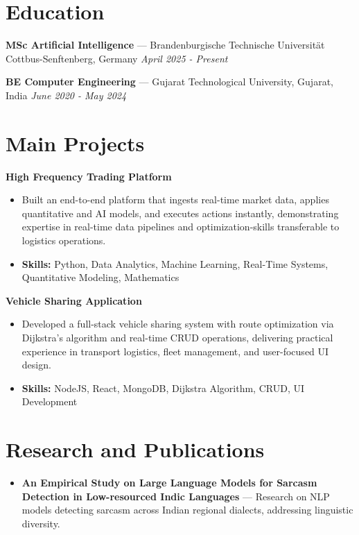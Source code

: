 \documentclass[a4paper,10pt]{article}
\begin{document}
\section*{Education}
\textbf{MSc Artificial Intelligence} — Brandenburgische Technische Universität Cottbus-Senftenberg, Germany \hfill \textit{April 2025 - Present}\par
\vspace{1.5pt}
\textbf{BE Computer Engineering} — Gujarat Technological University, Gujarat, India \hfill \textit{June 2020 - May 2024}\par

\section*{Main Projects}
\textbf{High Frequency Trading Platform}\par
\vspace{1pt}
\begin{itemize}
  \item Built an end-to-end platform that ingests real-time market data, applies quantitative and AI models, and executes actions instantly, demonstrating expertise in real-time data pipelines and optimization-skills transferable to logistics operations.
  \item \textbf{Skills:} Python, Data Analytics, Machine Learning, Real-Time Systems, Quantitative Modeling, Mathematics
\end{itemize}
\vspace{3pt}
\textbf{Vehicle Sharing Application}\par
\vspace{1pt}
\begin{itemize}
  \item Developed a full-stack vehicle sharing system with route optimization via Dijkstra's algorithm and real-time CRUD operations, delivering practical experience in transport logistics, fleet management, and user-focused UI design.
  \item \textbf{Skills:} NodeJS, React, MongoDB, Dijkstra Algorithm, CRUD, UI Development
\end{itemize}

\section*{Research and Publications}
\begin{itemize}
\item \textbf{An Empirical Study on Large Language Models for Sarcasm Detection in Low-resourced Indic Languages} — Research on NLP models detecting sarcasm across Indian regional dialects, addressing linguistic diversity.
\end{itemize}
\end{document}
